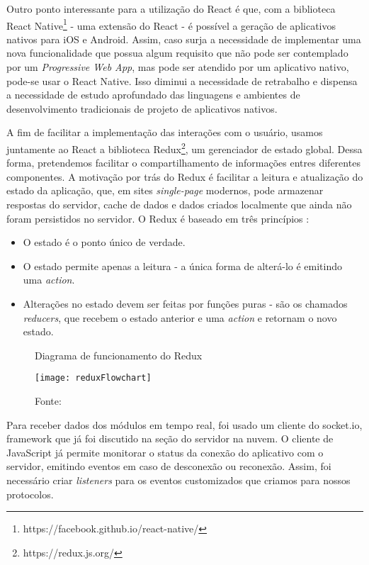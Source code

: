 Outro ponto interessante para a utilização do React é que, com a biblioteca React Native\footnote{https://facebook.github.io/react-native/} - uma extensão do React - é possível a geração de aplicativos nativos para iOS e Android. Assim, caso surja a necessidade de implementar uma nova funcionalidade que possua algum requisito que não pode ser contemplado por um \textit{Progressive Web App}, mas pode ser atendido por um aplicativo nativo, pode-se usar o React Native. Isso diminui a necessidade de retrabalho e dispensa a necessidade de estudo aprofundado das linguagens e ambientes de desenvolvimento tradicionais de projeto de aplicativos nativos.

A fim de facilitar a implementação das interações com o usuário, usamos juntamente ao React a biblioteca Redux\footnote{https://redux.js.org/}, um gerenciador de estado global. Dessa forma, pretendemos facilitar o compartilhamento de informações entres diferentes componentes. A motivação por trás do Redux é facilitar a leitura e atualização do estado da aplicação, que, em sites \textit{single-page} modernos, pode armazenar respostas do servidor, cache de dados e dados criados localmente que ainda não foram persistidos no servidor. O Redux é baseado em três princípios \cite{redux}:

\begin{itemize}
\item O estado é o ponto único de verdade.
\item O estado permite apenas a leitura - a única forma de alterá-lo é emitindo uma \textit{action}.
\item Alterações no estado devem ser feitas por funções puras - são os chamados \textit{reducers}, que recebem o estado anterior e uma \textit{action} e retornam o novo estado.
\end{itemize}

\begin{figure}
	\centering
	\caption{Diagrama de funcionamento do Redux}
  \texttt{[image: reduxFlowchart]}
  \caption*{Fonte: \cite{reduxdataflow}}
\label{fig:reduxFlowchart}
\end{figure}

Para receber dados dos módulos em tempo real, foi usado um cliente do socket.io, framework que já foi discutido na seção do servidor na nuvem. O cliente de JavaScript já permite monitorar o status da conexão do aplicativo com o servidor, emitindo eventos em caso de desconexão ou reconexão. Assim, foi necessário criar \textit{listeners} para os eventos customizados que criamos para nossos protocolos.

